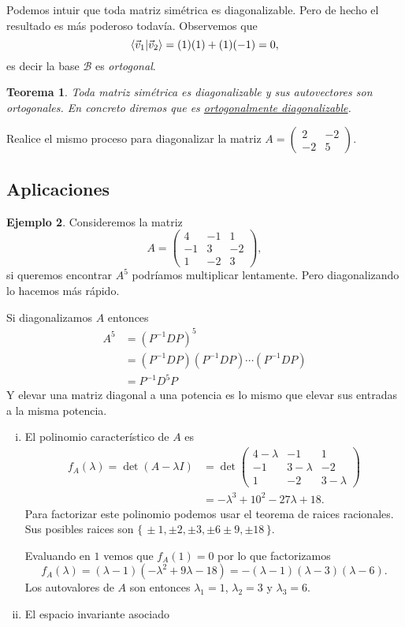 \documentclass[12pt]{article}
\theoremstyle{plain}
\newtheorem{Th}{Teorema}  %
\theoremstyle{definition}
\newtheorem{Ex}[Th]{Ejemplo}           %
\theoremstyle{remark}
\newcommand{\la}{\lambda}           %
\newcommand{\cB}{\mathcal{B}}       %
\renewcommand{\:}{\colon}           %
\newcommand{\un}[1]{\underline{#1}}
\renewcommand{\.}{\Cdot}                %
\newcommand{\twobytwo}[4]{\begin{pmatrix} %
    #1 & #2 \\ #3 & #4 \end{pmatrix}}
\newcommand{\threebythree}[9]{\begin{pmatrix} %
  #1 & #2 & #3 \\ #4 & #5 & #6 \\ #7 & #8 & #9 \end{pmatrix}}
\newcommand{\set}[1]{\{\,#1\,\}}    %
\begin{document}
\begin{multicols}{2}
Podemos intuir que toda matriz simétrica es diagonalizable. Pero de hecho el resultado es más poderoso todavía. Observemos que 
$$\braket{\vec{v}_1}{\vec{v}_2}=(1)(1)+(1)(-1)=0,$$
es decir la base $\cB$ es \emph{ortogonal}.

\begin{Th}
  Toda matriz simétrica es diagonalizable y sus autovectores son ortogonales. En concreto diremos que es \un{ortogonalmente diagonalizable}.
\end{Th}
\begin{ptcbP}
Realice el mismo proceso para diagonalizar la matriz $A=\twobytwo{2}{-2}{-2}{5}$.
\iffalse
\begin{enumerate}
  \itemsep=-0.5em 
  \item Encuentre los autovalores de $A$.
  \item Calcule los espacios invariantes respectivos.
  \item Realice la multiplicación de matrices para corroborar.
\end{enumerate}
\fi
\end{ptcbP}
\newpage
\subsection*{Aplicaciones}

\begin{Ex}
Consideremos la matriz
$$A=\threebythree{4}{-1}{1}{-1}{3}{-2}{1}{-2}{3},$$
si queremos encontrar $A^5$ podríamos multiplicar lentamente. Pero diagonalizando lo hacemos más rápido.\par 
Si diagonalizamos $A$ entonces 
\begin{align*}
  A^5&=(P^{-1}DP)^5\\
  &=(P^{-1}DP)(P^{-1}DP)\cdots (P^{-1}DP)\\
  &=P^{-1}D^5P
\end{align*}
Y elevar una matriz diagonal a una potencia es lo mismo que elevar sus entradas a la misma potencia.
\begin{enumerate}[i)]
  \itemsep=-0.4em
  \item El polinomio característico de $A$ es 
  \begin{align*}
    f_A(\la)=\det(A-\la I)&=\det\threebythree{4-\la}{-1}{1}{-1}{3-\la}{-2}{1}{-2}{3-\la}\\
    &=-\la^3+10^2-27\la+18.
  \end{align*}
  Para factorizar este polinomio podemos usar el teorema de raices racionales. Sus posibles raices son $\set{\pm 1,\pm 2,\pm 3,\pm 6\pm 9,\pm 18}$.\par 
  Evaluando en $1$ vemos que $f_A(1)=0$ por lo que factorizamos 
  $$f_A(\la)=(\la-1)(-\la^2+9\la-18)=-(\la-1)(\la-3)(\la-6).$$
  Los autovalores de $A$ son entonces $\la_1=1$, $\la_2=3$ y $\la_3=6$.
  \item El espacio invariante asociado 
  
\end{enumerate}
\end{Ex}
\end{multicols}
\end{document}
